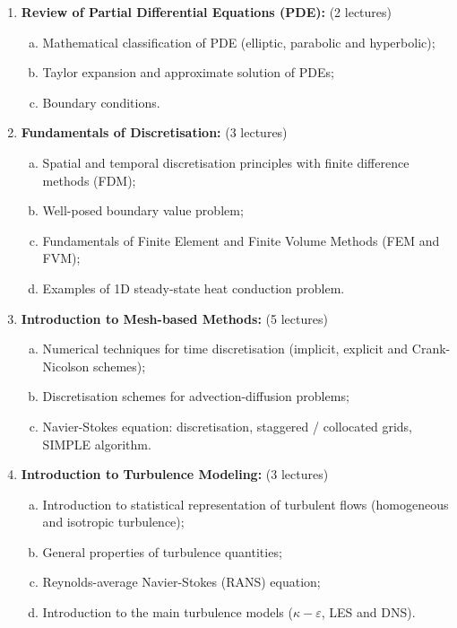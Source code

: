 \documentclass[12pts,a4paper,amsmath,amssymb,floatfix]{article}%
\begin{document}
\begin{enumerate}[{\bf Module 1}]
\item {\bf Review of Partial Differential Equations (PDE):} (2 lectures)
   \begin{enumerate}[(a)]
      \item Mathematical classification of PDE (elliptic, parabolic and hyperbolic);
      \item Taylor expansion and approximate solution of PDEs;
      \item Boundary conditions.
   \end{enumerate}

\item {\bf Fundamentals of Discretisation:} (3 lectures)
   \begin{enumerate}[(a)]
      \item Spatial and temporal discretisation principles with finite difference methods (FDM);
      \item Well-posed boundary value problem;
      \item Fundamentals of Finite Element and Finite Volume Methods (FEM and FVM);
      \item Examples of 1D steady-state heat conduction problem.
   \end{enumerate}

\item {\bf Introduction to Mesh-based Methods:} (5 lectures)
   \begin{enumerate}[(a)]
      \item Numerical techniques for time discretisation (implicit, explicit and Crank-Nicolson schemes);
      \item Discretisation schemes for advection-diffusion problems;%
      \item Navier-Stokes equation: discretisation, staggered / collocated grids, SIMPLE algorithm.
   \end{enumerate}

\item {\bf Introduction to Turbulence Modeling:} (3 lectures)
   \begin{enumerate}[(a)]
      \item Introduction to statistical representation of turbulent flows (homogeneous and isotropic turbulence);
      \item General properties of turbulence quantities;
      \item Reynolds-average Navier-Stokes (RANS) equation;
      \item Introduction to the main turbulence models ($\kappa-\varepsilon$, LES and DNS).
   \end{enumerate}


\end{enumerate}
\end{document}

